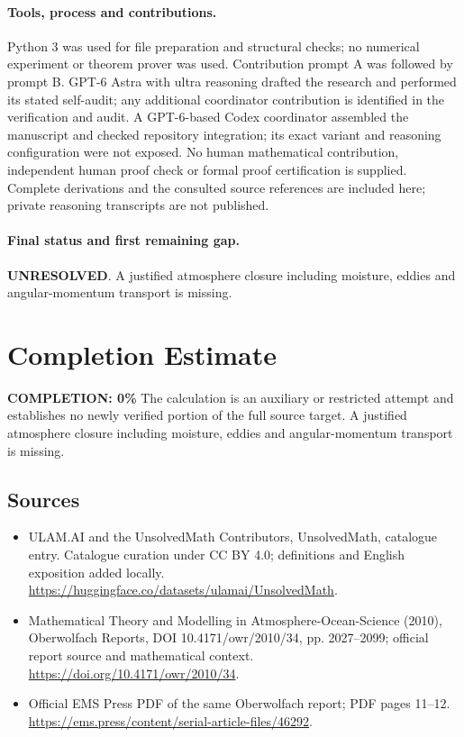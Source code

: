 \documentclass[11pt]{article}
\begin{document}
\paragraph{Tools, process and contributions.}
Python 3 was used for file preparation and structural checks; no numerical experiment or theorem prover was used. Contribution prompt A was followed by prompt B. GPT-6 Astra with ultra reasoning drafted the research and performed its stated self-audit; any additional coordinator contribution is identified in the verification and audit. A GPT-6-based Codex coordinator assembled the manuscript and checked repository integration; its exact variant and reasoning configuration were not exposed. No human mathematical contribution, independent human proof check or formal proof certification is supplied. Complete derivations and the consulted source references are included here; private reasoning transcripts are not published.

\paragraph{Final status and first remaining gap.}
\textbf{UNRESOLVED}. A justified atmosphere closure including moisture, eddies and angular-momentum transport is missing.

\section{Completion Estimate}
\noindent\textbf{COMPLETION: 0\%}
The calculation is an auxiliary or restricted attempt and establishes no newly verified portion of the full source target. A justified atmosphere closure including moisture, eddies and angular-momentum transport is missing.

\subsection{Sources}
\begin{itemize}
\item[\hypertarget{source:statement:1}{S1}] ULAM.AI and the UnsolvedMath Contributors, UnsolvedMath, catalogue entry. Catalogue curation under CC BY 4.0; definitions and English exposition added locally.
\url{https://huggingface.co/datasets/ulamai/UnsolvedMath}.
\item[\hypertarget{source:statement:2}{S2}] Mathematical Theory and Modelling in Atmosphere-Ocean-Science (2010), Oberwolfach Reports, DOI 10.4171/owr/2010/34, pp. 2027--2099; official report source and mathematical context.
\url{https://doi.org/10.4171/owr/2010/34}.
\item[\hypertarget{source:statement:3}{S3}] Official EMS Press PDF of the same Oberwolfach report; PDF pages 11--12.
\url{https://ems.press/content/serial-article-files/46292}.
\end{itemize}
\label{end:statement}
\end{document}
